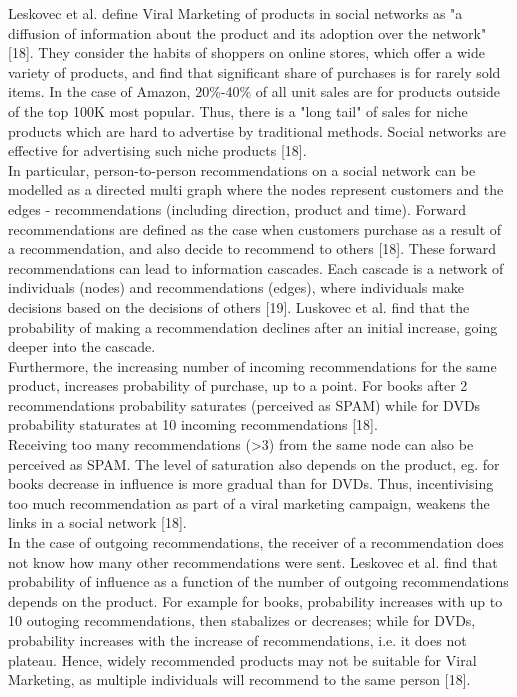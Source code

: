 \documentclass[conference,letterpaper]{IEEEtran}
\begin{document}
Leskovec et al. define Viral Marketing of products in social networks as "a diffusion of information about the product and its adoption over the network" [18].
They consider the habits of shoppers on online stores, which offer a wide variety of products, and find that significant share of purchases is for rarely sold items.
In the case of Amazon, 20\%-40\% of all unit sales are for products outside of the top 100K most popular. Thus, there is a "long tail" of sales for niche products which
are hard to advertise by traditional methods. Social networks are effective for advertising such niche products [18].\\
In particular, person-to-person recommendations on a social network can be modelled as a directed multi graph where the nodes represent customers and the edges - recommendations (including direction, product and time).
Forward recommendations are defined as the case when customers purchase as a result of a recommendation, and also decide to recommend to others [18]. These forward
recommendations can lead to information cascades. Each cascade is a network of individuals (nodes) and recommendations (edges), where individuals make decisions based on the decisions of others [19].
Luskovec et al. find that the probability of making a recommendation declines after an initial increase, going deeper into the cascade.\\
Furthermore, the increasing number of incoming recommendations for the same product, increases probability of purchase, up to a point. For books after 2 recommendations probability saturates (perceived as SPAM) while for DVDs probability staturates at 10 incoming recommendations [18]. \\
Receiving too many recommendations (>3) from the same node can also be perceived as SPAM. The level of saturation also depends on the product, eg. for books decrease in influence is more gradual than for DVDs. Thus, incentivising too much recommendation as part of a viral marketing
campaign, weakens the links in a social network [18].\\
In the case of outgoing recommendations, the receiver of a recommendation does not know how many other recommendations were sent. Leskovec et al. find that probability of influence as a function of the number of outgoing recommendations depends on the product.
For example for books, probability increases with up to 10 outoging recommendations, then stabalizes or decreases; while for DVDs, probability increases with the increase of recommendations, i.e. it does not plateau. Hence, widely recommended products may not be suitable for Viral Marketing, as multiple individuals
will recommend to the same person [18].\\
\end{document}
